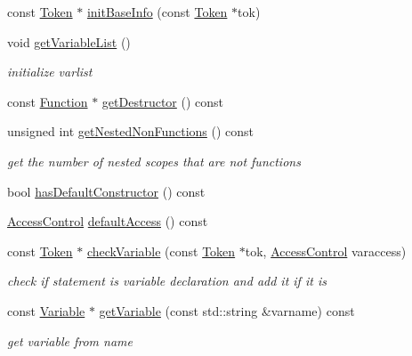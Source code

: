 \begin{DoxyCompactItemize}
\item 
const \hyperlink{class_token}{Token} $\ast$ \hyperlink{class_scope_a7ca6ed1ecc6f4ce819beee4b3af1a80a}{init\-Base\-Info} (const \hyperlink{class_token}{Token} $\ast$tok)
\item 
void \hyperlink{class_scope_aa65fc117c4fd480af4ae187c6e4a3cd3}{get\-Variable\-List} ()
\begin{DoxyCompactList}\small\item\em initialize varlist \end{DoxyCompactList}\item 
const \hyperlink{class_function}{Function} $\ast$ \hyperlink{class_scope_af09e1ac8b6097bf10901f9bd81ea31e1}{get\-Destructor} () const 
\item 
unsigned int \hyperlink{class_scope_a96f4386d4413d5aa2ce3970f428eb740}{get\-Nested\-Non\-Functions} () const 
\begin{DoxyCompactList}\small\item\em get the number of nested scopes that are not functions \end{DoxyCompactList}\item 
bool \hyperlink{class_scope_a034540f521543a6d143a4f8f5d8a3fcd}{has\-Default\-Constructor} () const 
\item 
\hyperlink{symboldatabase_8h_a2e9a0288e6c2df2ecebc50944c3ff9fa}{Access\-Control} \hyperlink{class_scope_a21a6fd0997f58b9f682232e42e3b26d2}{default\-Access} () const 
\item 
const \hyperlink{class_token}{Token} $\ast$ \hyperlink{class_scope_a2f5a07246428e87331d6a4c5c0cc0c06}{check\-Variable} (const \hyperlink{class_token}{Token} $\ast$tok, \hyperlink{symboldatabase_8h_a2e9a0288e6c2df2ecebc50944c3ff9fa}{Access\-Control} varaccess)
\begin{DoxyCompactList}\small\item\em check if statement is variable declaration and add it if it is \end{DoxyCompactList}\item 
const \hyperlink{class_variable}{Variable} $\ast$ \hyperlink{class_scope_a0f7fca478aa761359a611296216cbbd4}{get\-Variable} (const std\-::string \&varname) const 
\begin{DoxyCompactList}\small\item\em get variable from name \end{DoxyCompactList}\end{DoxyCompactItemize}
